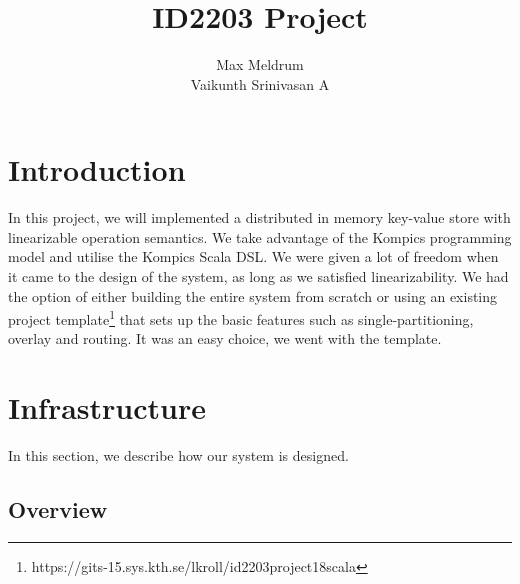 \documentclass[12pt]{article}
\title{\textbf{ID2203 Project}}
\author{Max Meldrum\\
	Vaikunth Srinivasan A}
\date{}
\begin{document}
\maketitle

\section{Introduction}
In this project, we will implemented a distributed in memory key-value store with linearizable operation semantics. We take advantage of the Kompics \cite{DBLP:conf/p2p/AradDH09} programming model and utilise the Kompics Scala DSL. We were given a lot of freedom when it came to the design of the system, as long as we satisfied linearizability. We had the option of either building the entire system from scratch or using an existing project template\footnote{https://gits-15.sys.kth.se/lkroll/id2203project18scala} that sets up the basic features such as single-partitioning, overlay and routing. It was an easy choice, we went with the template.

\section{Infrastructure}
In this section, we describe how our system is designed.

\subsection{Overview}
\end{document}
